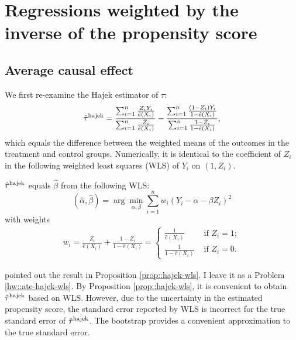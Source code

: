 \section{Regressions weighted by the inverse of the propensity score} 


\subsection{Average causal effect}


We first re-examine the Hajek estimator of $\tau$: 
$$
\hat{\tau}^\textup{hajek} = \frac{  \sum_{i=1}^n \frac{Z_i Y_i}{ \hat{e}(X_i) }  }{  \sum_{i=1}^n \frac{Z_i }{ \hat{e}(X_i) } }
- \frac{  \sum_{i=1}^n \frac{ (1-Z_i) Y_i}{ 1 - \hat{e}(X_i) }  }{  \sum_{i=1}^n \frac{ 1-Z_i}{ 1 - \hat{e}(X_i) }  },
$$
which equals the difference between the weighted means of the outcomes in the treatment and control groups. Numerically, it is identical to the coefficient of $Z_i$ in the following weighted least squares (WLS) of $Y_i$ on $(1,Z_i)$.


\begin{proposition}
\label{prop::hajek-wls}
$\hat{\tau}^\textup{hajek}$ equals $\hat{\beta}$ from the following WLS:
$$
(\hat{\alpha}, \hat{\beta}) = \arg\min_{\alpha, \beta} \sum_{i=1}^n w_i(Y_i - \alpha - \beta Z_i)^2
$$
 with weights 
\begin{eqnarray}\label{eq::weight-hajek}
w_i =  \frac{Z_i}{   \hat{e}(X_i)  } + \frac{1-Z_i}{ 1-  \hat{e}(X_i) } 
= 
\begin{cases}
\frac{1}{\hat{e}(X_i) } & \text{ if } Z_i=1;\\
\frac{1}{ 1- \hat{e}(X_i) } & \text{ if } Z_i=0.
\end{cases} 
\end{eqnarray}
\end{proposition}

\citet{imbens2004nonparametric} pointed out the result in Proposition \ref{prop::hajek-wls}. I leave it as a Problem \ref{hw::ate-hajek-wls}.  
By Proposition \ref{prop::hajek-wls}, it is convenient to obtain $\hat{\tau}^\textup{hajek}$ based on WLS. However, due to the uncertainty in the estimated propensity score, the standard error reported by WLS is incorrect for the true standard error of $\hat{\tau}^\textup{hajek}$. The bootstrap provides a convenient approximation to the true standard error. 

 



